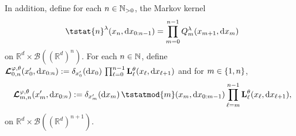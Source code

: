 \documentclass{article}
\begin{document}
In addition, define for each $n \in \mathbb{N}_{> 0}$, the Markov kernel  
$$
\tstat{n}^\parvar(x_n, \rmd x_{0:n - 1}) = \prod_{m = 0}^{n - 1} Q_{m}^{\parvar}(x_{m + 1}, \rmd x_m)
$$ 
on $\mathbb{R}^d \times \mathcal{B}((\mathbb{R}^d)^n)$. %
    For each $n \in \mathbb{N}$, define  $\boldsymbol{\mathcal{L}}^{\varphi,\theta}_{0, n}(x_0', \mathrm{d} x_{0:n}) := \delta_{x_0'}(\mathrm{d} x_0) \,  \prod_{\ell = 0}^{n - 1} \mathbf{L}_{\ell}^{\theta}(x_\ell, \mathrm{d} x_{\ell + 1})$ and for $m \in \{ 1, n \}$, 
\begin{equation} \label{eq:def:retrokmod}
    \retrokmod_{m, n}(x_m', \rmd x_{0:n}) \eqdef \delta_{x_m'}(\rmd x_m) \, \tstatmod{m}(x_m, \rmd x_{0:m - 1}) \prod_{\ell = m}^{n - 1} \uk{\ell}{\parvec}(x_\ell, \rmd x_{\ell + 1}), 
\end{equation}
on  $\mathbb{R}^d \times \mathcal{B}((\mathbb{R}^d)^{n+1})$. 
\end{document}
